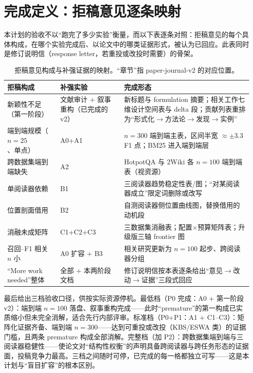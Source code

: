 \section{完成定义：拒稿意见逐条映射}
\label{sec:dod}

本计划的验收不以``跑完了多少实验''衡量，而以下表逐条对照：拒稿意见的每个具体构成，在哪个实验完成后、以论文中的哪类证据形式，被认为已回应。此表同时是修订说明信（response letter，若重投或改投时需要）的骨架。

\begin{table}[htbp]
\centering
\caption{拒稿意见构成与补强证据的映射。``章节''指 paper-journal-v2 的对应位置。}
\label{tab:dod}
\small
\begin{tabularx}{\textwidth}{@{}p{4.2cm}XX@{}}
\toprule
拒稿构成 & 补强实验 & 完成形态 \\
\midrule
新颖性不足（第一阶段） & 文献审计 + 叙事重构（已完成的 v2） & 新标题与 formulation 摘要；相关工作七维设计空间表与 delta 段；贡献列表重排为``形式化$\rightarrow$方法论$\rightarrow$发现$\rightarrow$实例'' \\
端到端规模（$n{=}25$、单点） & A0+A1 & $n{=}300$ 端到端主表，区间半宽 $\approx\pm3.3$ F1 点；BM25 进入端到端层 \\
跨数据集端到端缺失 & A2 & HotpotQA 与 2Wiki 各 $n{=}100$ 端到端表（视资源） \\
单阅读器依赖 & B1 & 三阅读器趋势稳定性表/图；``对某阅读器成立''限定词删除或改写 \\
位置剖面借用 & B2 & 自测阅读器侧位置曲线图，替换借用的动机段 \\
消融未成矩阵 & C1+C2+C3 & 三数据集消融表；配置$\times$预算矩阵表；升级版三轴 frontier 图 \\
召回--F1 相关 $n$ 小 & A0 扩容 + B3 & 相关研究更新为 $n{=}100$ 起步、跨阅读器分组 \\
``More work needed''整体 & 全部 + 本两阶段文档 & 修订说明信按本表逐条给出``意见$\rightarrow$改动$\rightarrow$证据''三段式回应 \\
\bottomrule
\end{tabularx}
\end{table}

最后给出三档验收口径，供按实际资源停机。最低档（P0 完成：A0 + 第一阶段 v2）：端到端 $n{=}100$ 落盘、叙事重构完成——此时``premature''的第一构成已实质缩小但未完全消解，适合先行内部评审。标准档（P0+P1：A1 + C1--C3）：矩阵化证据齐备、端到端 $n{=}300$——达到可重投或改投（KBS/ESWA 类）的证据门槛，且两条 premature 构成全部消解。完整档（加 P2）：跨数据集端到端与三阅读器稳健性——使论文对``结构性权衡''的声明具备跨阅读器与跨任务形态的证据面，投稿竞争力最高。三档之间随时可停，已完成的每一格都独立可写——这是本计划与``盲目扩容''的根本区别。
